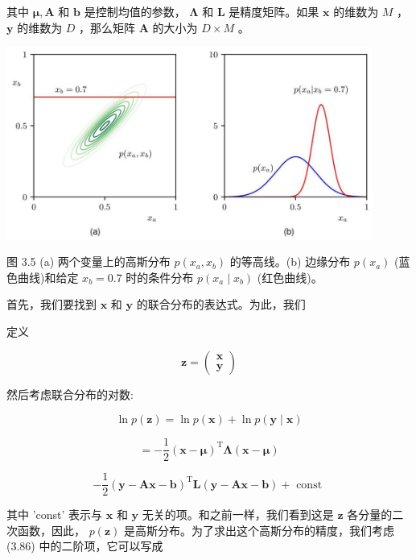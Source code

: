 \documentclass[10pt]{article}
\begin{document}
其中 \(\mathbf{\mu },\mathbf{A}\) 和 \(\mathbf{b}\) 是控制均值的参数， \(\mathbf{\Lambda }\) 和 \(\mathbf{L}\) 是精度矩阵。如果 \(\mathbf{x}\) 的维数为 \(M\) ， \(\mathbf{y}\) 的维数为 \(D\) ，那么矩阵 \(\mathbf{A}\) 的大小为 \(D \times  M\) 。

\begin{center}
\includegraphics[max width=0.9\textwidth]{images/0194e279-9b28-703a-88f4-c3ac21e2010d_101_325_345_1158_609_0.jpg}
\end{center}
\hspace*{3em} 

图 3.5 (a) 两个变量上的高斯分布 \(p\left( {{x}_{a},{x}_{b}}\right)\) 的等高线。(b) 边缘分布 \(p\left( {x}_{a}\right)\) (蓝色曲线)和给定 \({x}_{b} = {0.7}\) 时的条件分布 \(p\left( {{x}_{a} \mid  {x}_{b}}\right)\) (红色曲线)。

首先，我们要找到 \(\mathbf{x}\) 和 \(\mathbf{y}\) 的联合分布的表达式。为此，我们

定义

\[
\mathbf{z} = \left( \begin{array}{l} \mathbf{x} \\  \mathbf{y} \end{array}\right)  \tag{3.85}
\]

然后考虑联合分布的对数:

\[
\ln p\left( \mathbf{z}\right)  = \ln p\left( \mathbf{x}\right)  + \ln p\left( {\mathbf{y} \mid  \mathbf{x}}\right)
\]

\[
=  - \frac{1}{2}{\left( \mathbf{x} - \mathbf{\mu }\right) }^{\mathrm{T}}\mathbf{\Lambda }\left( {\mathbf{x} - \mathbf{\mu }}\right)
\]

\[
- \frac{1}{2}{\left( \mathbf{y} - \mathbf{A}\mathbf{x} - \mathbf{b}\right) }^{\mathrm{T}}\mathbf{L}\left( {\mathbf{y} - \mathbf{A}\mathbf{x} - \mathbf{b}}\right)  + \text{ const } \tag{3.86}
\]

其中 ’const’ 表示与 \(\mathbf{x}\) 和 \(\mathbf{y}\) 无关的项。和之前一样，我们看到这是 \(\mathbf{z}\) 各分量的二次函数，因此， \(p\left( \mathbf{z}\right)\) 是高斯分布。为了求出这个高斯分布的精度，我们考虑 (3.86) 中的二阶项，它可以写成
\end{document}
